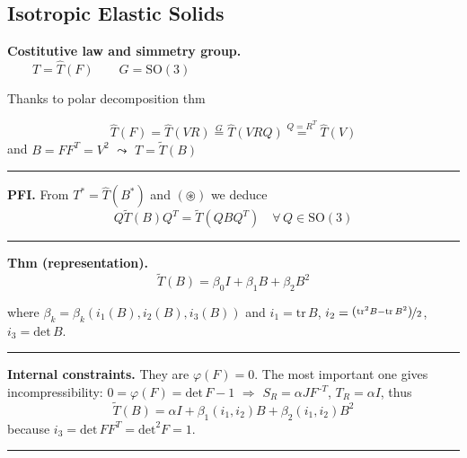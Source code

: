 
\subsection{\texorpdfstring{\color{red}Isotropic Elastic Solids}{}}


\textbf{Costitutive law and simmetry group.} \\
$\qquad T=\hat{T}(F)\qquad G=\text{SO}(3)$

Thanks to polar decomposition thm
\vspace{-1em}

\begin{equation*}
\hat{T}(F)=\hat{T}(VR)\overset{G}{=}\hat{T}(VRQ)\overset{Q=R^T}{=}\hat{T}(V)
\end{equation*}
and $B=FF^T=V^2$ $\leadsto$ $T=\widetilde{T}(B)$

\rule{0.31\textwidth}{0.2pt}
\smallskip

\textbf{PFI.} From $T^*=\hat{T}(B^*)$ and $(\circledast)$ we deduce
\begin{equation*}
\boxed{Q\widetilde{T}(B)Q^T=\widetilde{T}(QBQ^T)\quad \forall\,Q\in\text{SO}(3)}
\end{equation*}

\rule{0.31\textwidth}{0.2pt}
\smallskip

\textbf{Thm (representation).} 
\begin{equation*}
\boxed{\widetilde{T}(B)=\beta_0I+\beta_1B+\beta_2B^2}
\end{equation*}

where $\beta_k=\beta_k(i_1(B),i_2(B),i_3(B))$ and $i_1=\text{tr}\,B$, $i_2=\nicefrac{\left(\text{tr}^2 B- \text{tr}\,B^2\right)}{2}$, $i_3=\text{det}\,B$.

\rule{0.31\textwidth}{0.2pt}
\smallskip

\textbf{Internal constraints.} They are $\varphi(F)=0$. The most important one gives incompressibility: $0=\varphi(F)=\text{det}\,F-1$ $\Longrightarrow$ $S_R=\alpha JF^{\,\text{-}T}$, $T_R=\alpha I$, thus
\begin{equation*}
\widetilde{T}(B)=\alpha I + \beta_1 (i_1,i_2)B+\beta_2(i_1,i_2)B^2
\end{equation*} 
because $i_3=\text{det}\,FF^T=\text{det}^2F=1$.

\rule{0.31\textwidth}{1pt}








